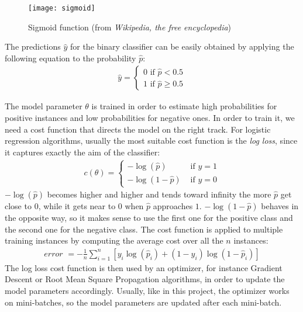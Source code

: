 \begin{figure}[htbp]
    \centering
    \texttt{[image: sigmoid]}
    \caption{Sigmoid function (from \textit{Wikipedia, the free encyclopedia})}
    \label{fig:sigmoid}
\end{figure}

The predictions $\hat{y}$ for the binary classifier can be easily obtained by applying the following equation to the probability $\hat{p}$:
\begin{align}
    \hat{y} = \left\{\begin{array}{l}{0 \text { if } \hat{p}<0.5} \\ {1 \text { if } \hat{p} \geq 0.5}\end{array}\right.
\end{align}

The model parameter $\theta$ is trained in order to estimate high probabilities for positive instances and low probabilities for negative ones. In order to train it, we need a cost function that directs the model on the right track. For logistic regression algorithms, usually the most suitable cost function is the \textit{log loss}, since it captures exactly the aim of the classifier:
\begin{align}
    c(\theta) = \left\{\begin{array}{ll}{-\log (\hat{p})} & {\text { if } y=1} \\ {-\log (1-\hat{p})} & {\text { if } y=0}\end{array}\right.
\end{align}
$-\log (\hat{p})$ becomes higher and higher and tends toward infinity the more $\hat{p}$ get close to $0$, while it gets near to $0$ when $\hat{p}$ approaches $1$. $-\log (1-\hat{p})$ behaves in the opposite way, so it makes sense to use the first one for the positive class and the second one for the negative class. The cost function is applied to multiple training instances by computing the average cost over all the $n$ instances:
\begin{align}
    \textit{error } = -\frac{1}{n} \sum^{n}_{i=1}\left[y_i \log(\hat{p}_i) +
    (1 - y_i) \log(1 - \hat{p}_i)\right]
\end{align}
The log loss cost function is then used by an optimizer, for instance Gradient Descent or Root Mean Square Propagation algorithms, in order to update the model parameters accordingly. Usually, like in this project, the optimizer works on mini-batches, so the model parameters are updated after each mini-batch.

